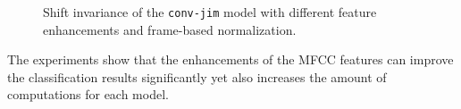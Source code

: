 \FloatBarrier
\noindent
\begin{figure}[!ht]
  \centering
  \caption{Shift invariance of the \texttt{conv-jim} model with different feature enhancements and frame-based normalization.}
  \label{fig:exp_fs_mfcc_tb_shift_conv-jim}
\end{figure}
\FloatBarrier
\noindent
The experiments show that the enhancements of the MFCC features can improve the classification results significantly yet also increases the amount of computations for each model.